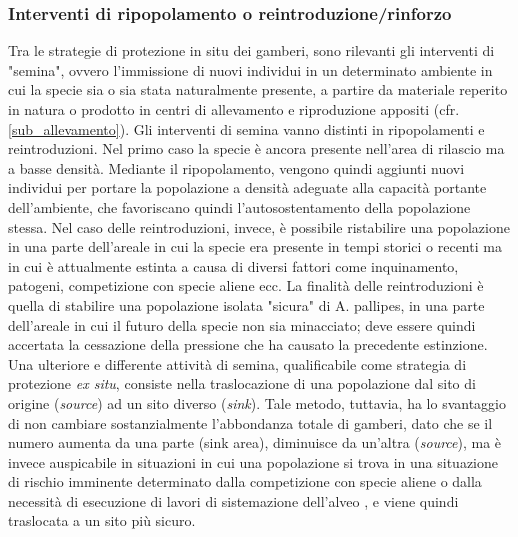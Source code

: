 \documentclass[11pt,a4paper,italian,twoside,openany]{memoir}
\begin{document}
\subsubsection{Interventi di ripopolamento o reintroduzione/rinforzo}
\label{subsub_ripop_int}
Tra le strategie di protezione in situ dei gamberi, sono rilevanti gli interventi di "semina", ovvero l'immissione di nuovi individui in un determinato ambiente in cui la specie sia o sia stata naturalmente presente, a partire da materiale reperito in natura o prodotto in centri di allevamento e riproduzione appositi (cfr. \ref{sub_allevamento}). Gli interventi di semina vanno distinti in ripopolamenti e reintroduzioni. Nel primo caso la specie è ancora presente nell'area di rilascio ma a basse densità. Mediante il ripopolamento, vengono quindi aggiunti nuovi individui per portare la popolazione a densità adeguate alla capacità portante dell'ambiente, che favoriscano quindi l'autosostentamento della popolazione stessa. Nel caso delle reintroduzioni, invece, è possibile ristabilire una popolazione in una parte dell'areale in cui la specie era presente in tempi storici o recenti ma in cui è attualmente estinta a causa di diversi fattori come inquinamento, patogeni, competizione con specie aliene ecc. La finalità delle reintroduzioni è quella di stabilire una popolazione isolata "sicura" di A. pallipes, in una parte dell'areale in cui il futuro della specie non sia minacciato; deve essere quindi accertata la cessazione della pressione che ha causato la precedente estinzione. Una ulteriore e differente attività di semina, qualificabile come strategia di protezione \emph{ex situ}, consiste nella traslocazione di una popolazione dal sito di origine (\emph{source}) ad un sito diverso (\emph{sink}). Tale metodo, tuttavia, ha lo svantaggio di non cambiare sostanzialmente l'abbondanza totale di gamberi, dato che se il numero aumenta da una parte (sink area), diminuisce da un'altra (\emph{source}), ma è invece auspicabile in situazioni in cui una popolazione si trova in una situazione di rischio imminente determinato dalla competizione con specie aliene o dalla necessità di esecuzione di lavori di sistemazione dell'alveo \cite{Kemp 2003}, e viene quindi traslocata a un sito più sicuro.
\end{document}
